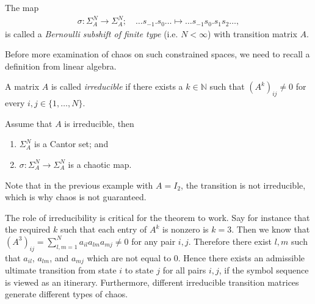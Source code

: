 \begin{definition}
	The map
	\begin{align}
		\sigma:\Sigma_{A}^{N}\to \Sigma_{A}^{N};\quad \ldots s_{-1}\bm{.} s_0 \ldots \mapsto \ldots s_{-1} s_0 \bm{.} s_1 s_2 \ldots,
	\end{align}
	is called a \emph{Bernoulli subshift of finite type} (i.e. $N< \infty $) with transition matrix $A$.
\end{definition}
Before more examination of chaos on such constrained spaces, we need to recall a definition from linear algebra.
\begin{definition}
	A matrix $A$ is called \emph{irreducible} if there exists a $k \in \mathbb{N}$ such that $\left(A^{k}\right)_{ij}\neq 0$ for every $i,j\in \{1,\ldots,N\}$.
\end{definition}

\begin{theorem}[]
	Assume that $A$ is irreducible, then 
	\begin{enumerate}
		\item $\Sigma_{A}^{N}$ is a Cantor set; and
		\item $\sigma:\Sigma_{A}^{N}\to \Sigma_{A}^{N}$ is a chaotic map.
	\end{enumerate}
\end{theorem}

Note that in the previous example with $A=I_{2}$, the transition is not irreducible, which is why chaos is not guaranteed.

The role of irreducibility is critical for the theorem to work. Say for instance that the required $k$ such that each entry of $A^{k}$ is nonzero is $k=3$. Then we know that $\left(A^{3}\right)_{ij} = \sum_{l,m=1}^{N} a_{il}a_{lm}a_{mj} \neq 0$ for any pair $i,j$. Therefore there exist $l,m$ such that $a_{il}$, $a_{lm}$, and $a_{mj}$ which are not equal to 0. Hence there exists an admissible ultimate transition from state $i$ to state $j$ for all pairs $i,j$, if the symbol sequence is viewed as an itinerary. Furthermore, different irreducible transition matrices generate different types of chaos. 

